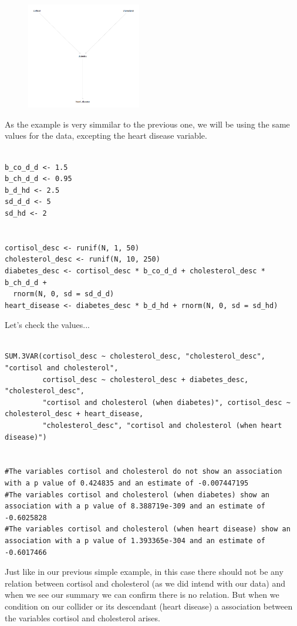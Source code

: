 \documentclass{article}
\begin{document}
\begin{figure}[h]
\includegraphics[width=5cm]{DAG_DESCENDANT_DIAB.png}
\centering
\end{figure}


As the example is very simmilar to the previous one, we will be using the same values for the data, excepting the heart disease variable.
 
 
\begin{lstlisting}
 
b_co_d_d <- 1.5
b_ch_d_d <- 0.95
b_d_hd <- 2.5
sd_d_d <- 5
sd_hd <- 2


cortisol_desc <- runif(N, 1, 50)
cholesterol_desc <- runif(N, 10, 250)
diabetes_desc <- cortisol_desc * b_co_d_d + cholesterol_desc * b_ch_d_d + 
  rnorm(N, 0, sd = sd_d_d)
heart_disease <- diabetes_desc * b_d_hd + rnorm(N, 0, sd = sd_hd)

\end{lstlisting}

Let's check the values...

\begin{lstlisting}

SUM.3VAR(cortisol_desc ~ cholesterol_desc, "cholesterol_desc", "cortisol and cholesterol", 
         cortisol_desc ~ cholesterol_desc + diabetes_desc, "cholesterol_desc",
         "cortisol and cholesterol (when diabetes)", cortisol_desc ~ cholesterol_desc + heart_disease,
         "cholesterol_desc", "cortisol and cholesterol (when heart disease)")


#The variables cortisol and cholesterol do not show an association with a p value of 0.424835 and an estimate of -0.007447195 
#The variables cortisol and cholesterol (when diabetes) show an association with a p value of 8.388719e-309 and an estimate of -0.6025828 
#The variables cortisol and cholesterol (when heart disease) show an association with a p value of 1.393365e-304 and an estimate of -0.6017466 

\end{lstlisting}

Just like in our previous simple example, in this case there should not be any relation between cortisol and cholesterol (as we did intend with our data) and when we see our summary we can confirm there is no relation. But when we  condition on our collider or its descendant (heart disease) a association between the variables cortisol and cholesterol arises. 
\end{document}
